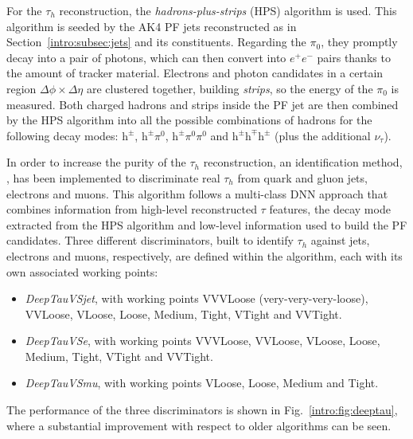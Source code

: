 \documentclass[../main.tex]{subfiles}
\begin{document}
For the $\tau_h$ reconstruction, the \textit{hadrons-plus-strips} (HPS) algorithm \cite{intro:id:hps} is used. This algorithm is seeded by the AK4 PF jets reconstructed as in Section~\ref{intro:subsec:jets} and its constituents. Regarding the $\pi_0$, they promptly decay into a pair of photons, which can then convert into $e^+e^-$ pairs thanks to the amount of tracker material. Electrons and photon candidates in a certain region $\Delta\phi\times\Delta\eta$ are clustered together, building \textit{strips}, so the energy of the $\pi_0$ is measured. Both charged hadrons and strips inside the PF jet are then combined by the HPS algorithm into all the possible combinations of hadrons for the following decay modes: $\text{h}^\pm$, $\text{h}^\pm\pi^0$, $\text{h}^\pm\pi^0\pi^0$ and $\text{h}^\pm \text{h}^\mp \text{h}^\pm$ (plus the additional $\nu_\tau$).


In order to increase the purity of the $\tau_h$ reconstruction, an identification method, \deeptau{} \cite{intro:id:deeptau}, has been implemented to discriminate real $\tau_h$ from quark and gluon jets, electrons and muons. This algorithm follows a multi-class DNN approach that combines information from high-level reconstructed $\tau$ features, the decay mode extracted from the HPS algorithm and low-level information used to build the PF candidates. Three different discriminators, built to identify $\tau_h$ against jets, electrons and muons, respectively, are defined within the \deeptau{} algorithm, each with its own associated working points:
\begin{itemize}
	\item \textit{DeepTauVSjet}, with working points VVVLoose (very-very-very-loose), VVLoose, VLoose, Loose, Medium, Tight, VTight and VVTight.
	\item \textit{DeepTauVSe}, with working points VVVLoose, VVLoose, VLoose, Loose, Medium, Tight, VTight and VVTight.
	\item \textit{DeepTauVSmu}, with working points VLoose, Loose, Medium and Tight.
\end{itemize}
The performance of the three discriminators is shown in Fig.~\ref{intro:fig:deeptau}, where a substantial improvement with respect to older algorithms can be seen.
\end{document}
